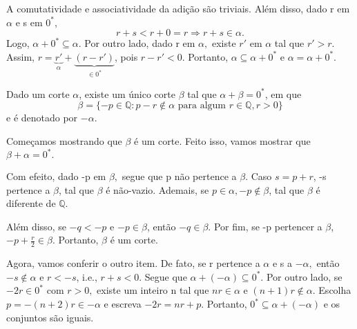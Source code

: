 \documentclass[analysis_notes.tex]{subfiles}
\begin{document}
A comutatividade e associatividade da adi\c c\~ao s\~ao triviais. Al\'em disso, dado r em $\alpha$ e s em $0^*,$
$$
	r + s < r + 0 = r\Rightarrow r + s \in \alpha.
$$
Logo, $\alpha + 0^* \subseteq{\alpha}$. Por outro lado, dado r em $\alpha,$ existe $r'\text{ em } \alpha$ tal que $r' > r.$
Assim, $r = \underbrace{r'}_{\alpha} + \underbrace{(r - r')}_{\in 0^*}$, pois $r - r' < 0.$ Portanto, $\alpha \subseteq{\alpha + 0^*}$ e
$\alpha = \alpha + 0^*.$
\begin{prop*}
	Dado um corte $\alpha$, existe um \'unico corte $\beta$ tal que $\alpha + \beta = 0^*$, em que
	$$
		\beta = \{-p\in \mathbb{Q}: p - r\not\in \alpha \text{ para algum } r\in \mathbb{Q}, r > 0\}
	$$
	e \'e denotado por $-\alpha$.
\end{prop*}
\begin{proof*}
	Come\c camos mostrando que $\beta$ \'e um corte. Feito isso, vamos mostrar que $\beta + \alpha = 0^*.$

	Com efeito, dado -p em $\beta,$ segue que p n\~ao pertence a $\beta$. Caso $s = p + r$, -s pertence a $\beta$, tal que
	$\beta$ \'e n\~ao-vazio. Ademais, se $p\in \alpha, -p\not\in \beta$, tal que $\beta$ \'e diferente de $\mathbb{Q}.$

	Al\'em disso, se $-q < -p$ e $-p\in \beta$, ent\~ao $-q \in \beta$. Por fim, se -p pertencer a $\beta$, $\displaystyle -p + \frac{r}{2}\in \beta$.
	Portanto, $\beta$ \'e um corte.

	Agora, vamos conferir o outro item. De fato, se r pertence a $\alpha$ e s a $-\alpha,$ ent\~ao $-s\not\in \alpha$ e $r < -s$, i.e.,
	$r + s < 0.$ Segue que $\alpha + (-\alpha) \subseteq{0^*}.$ Por outro lado, se $-2r\in 0^*$ com $r > 0,$ existe um inteiro n tal que
	$nr\in \alpha$ e $(n+1)r\not\in \alpha$. Escolha $p = -(n+2)r\in -\alpha$ e escreva $-2r = nr + p.$ Portanto, $0^*\subseteq{\alpha + (-\alpha)}$ e os
	conjuntos s\~ao iguais. \qedsymbol
\end{proof*}
\end{document}
